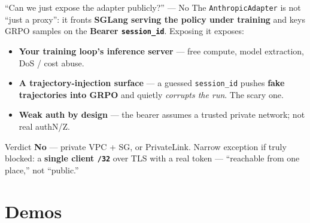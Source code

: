 \documentclass[aspectratio=169]{beamer}
\begin{document}
\begin{frame}{``Can we just expose the adapter publicly?'' --- No}
  \footnotesize The \texttt{AnthropicAdapter} is not ``just a proxy'': it fronts \textbf{SGLang serving the
  policy under training} and keys GRPO samples on the \textbf{Bearer \texttt{session\_id}}. Exposing it exposes:
  \vspace{0.3em}
  \begin{itemize}\setlength\itemsep{0.4em}
    \item \textbf{Your training loop's inference server} --- free compute, model extraction, DoS / cost abuse.
    \item \textbf{A trajectory-injection surface} --- a guessed \texttt{session\_id} pushes \textbf{fake
      trajectories into GRPO} and quietly \emph{corrupts the run}. The scary one.
    \item \textbf{Weak auth by design} --- the bearer assumes a trusted private network; not real authN/Z.
  \end{itemize}
  \vspace{0.3em}
  \begin{block}{Verdict}
    \footnotesize \textbf{No} --- private VPC + SG, or PrivateLink. Narrow exception if truly blocked: a
    \textbf{single client \texttt{/32}} over TLS with a real token --- ``reachable from one place,'' not ``public.''
  \end{block}
\end{frame}

\section{Demos}
\end{document}
